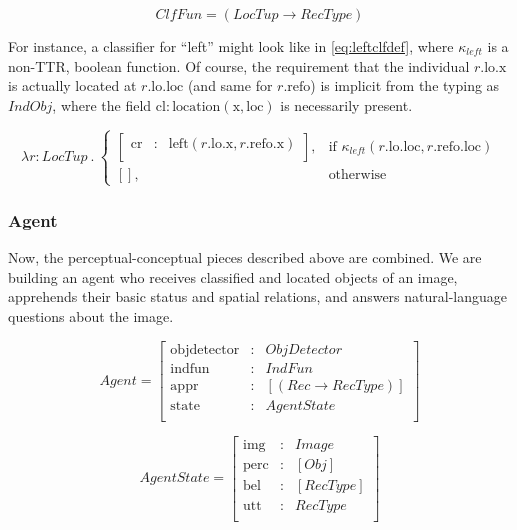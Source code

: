 \begin{equation}\label{eq:clf}
ClfFun = ( LocTup \rightarrow RecType )
\end{equation}

For instance, a classifier for ``left'' might look like in \autoref{eq:leftclfdef}, where $\kappa_{left}$ is a non-TTR, boolean function.
Of course, the requirement that the individual $r.\text{lo}.\text{x}$ is actually located at $r.\text{lo}.\text{loc}$ (and same for $r.\text{refo}$) is implicit from the typing as $IndObj$, where the field $\text{cl} : \text{location}(\text{x}, \text{loc})$ is necessarily present.

\begin{equation}\label{eq:leftclfdef}
\lambda r : LocTup \ .\ 
\begin{cases}
\left[\begin{array}{rcl}
    \text{cr} &:& \text{left}(r.\text{lo}.\text{x}, r.\text{refo}.\text{x}) \\
\end{array}\right],
& \text{if } \kappa_{left}(r.\text{lo}.\text{loc}, r.\text{refo}.\text{loc}) \\
[], & \text{otherwise}
\end{cases}
\end{equation}



\subsubsection{Agent}

Now, the perceptual-conceptual pieces described above are combined.
We are building an agent who receives classified and located objects of an image, apprehends their basic status and spatial relations, and answers natural-language questions about the image.

\begin{equation}\label{eq:agent}
Agent = \left[\begin{array}{rcl}
    \text{objdetector} &:& ObjDetector \\
    \text{indfun} &:& IndFun \\
    \text{appr} &:& [(Rec \rightarrow RecType)] \\
    \text{state} &:& AgentState \\
    \end{array}\right]
\end{equation}

\begin{equation}\label{eq:state}
AgentState = \left[\begin{array}{rcl}
    \text{img} &:& Image \\
    \text{perc} &:& [Obj] \\
    \text{bel} &:& [RecType] \\
    \text{utt} &:& RecType \\
    \end{array}\right]
\end{equation}

